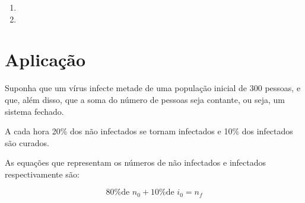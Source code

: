 \documentclass[a4paper,12pt]{article}
\begin{document}
 \begin{enumerate}
 
    \item
    
 

    \item

    
 \end{enumerate}
 
\newpage

\newpage

\section{Aplicação}

Suponha que um vírus infecte metade de uma população inicial de 300 pessoas, e que, além disso, que a soma do número de pessoas seja contante, ou seja, um sistema fechado.

A cada hora 20\% dos não infectados se tornam infectados e 10\% dos infectados são curados.

As equações que representam os números de não infectados e infectados respectivamente são:

$$ \text{80\% de } n_{0} + \text{10\% de } i_{0} = n_{f} $$
\end{document}
